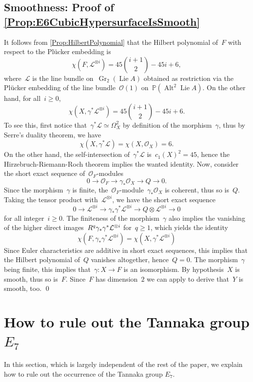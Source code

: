 \documentclass[a4paper]{amsart}
\newcommand{\bbP}{\mathbb{P}}
\newcommand{\cL}{\mathcal{L}}
\newcommand{\cO}{\mathcal{O}}
\newcommand{\rR}{\textup{R}}
\newcommand{\too}{\longrightarrow}
\newcommand{\iso}{\simeq}
\DeclareMathOperator{\Gr}{Gr}
\DeclareMathOperator{\Lie}{Lie}
\DeclareMathOperator{\Alt}{Alt}
\renewcommand{\ge}{\geqslant}
\theoremstyle{plain}
\theoremstyle{definition}
\numberwithin{equation}{section}
\begin{document}
\subsection{Smoothness: Proof of \cref{Prop:E6CubicHypersurfaceIsSmooth}}  It follows from \cref{Prop:HilbertPolynomial} that the Hilbert polynomial of~$F$ with respect to the Pl\"ucker embedding is
\[ \chi(F, \cL^{\otimes i}) =  \textstyle 45 \binom{i+1}{2} - 45 i + 6,\]
where~$\cL$ is the line bundle on~$\Gr_2(\Lie A)$ obtained as restriction via the Pl\"ucker embedding of the line bundle~$\cO(1)$ on~$\bbP(\Alt^2 \Lie A)$. On the other hand, for all~$i \ge 0$,
\[ \chi(X, \gamma^\ast \cL^{\otimes i}) =  \textstyle 45 \binom{i+1}{2} - 45 i + 6.\]
To see this, first notice that~$\gamma^\ast \cL \iso \Omega^2_X$ by definition of the morphism~$\gamma$, thus by Serre's duality theorem, we have
\[\chi(X, \gamma^\ast \cL)  =  \chi(X, \cO_X) = 6.\]
On the other hand, the self-intersection of~$\gamma^\ast \cL$ is~$c_1(X)^2 = 45$, hence the Hirzebruch-Riemann-Roch theorem implies the wanted identity. Now, consider the short exact sequence of~$\cO_F$-modules
\[ 0 \too \cO_F \too \gamma_\ast \cO_X \too Q \too 0.\]
Since the morphism~$\gamma$ is finite, the~$\cO_F$-module~$\gamma_\ast \cO_X$ is coherent, thus so is~$Q$. Taking the tensor product with~$\cL^{\otimes i}$, we have the short exact sequence
\[ 0 \too \cL^{\otimes i} \too \gamma_\ast \gamma^\ast  \cL^{\otimes i} \too Q \otimes \cL^{\otimes i} \too 0\]
for all integer~$i \ge 0$. The finiteness of the morphism~$\gamma$ also implies the vanishing of the higher direct images~$\rR^q \gamma_\ast \gamma^\ast \cL^{\otimes i}$ for~$q \ge 1$, which yields the identity
\[ \chi(F, \gamma_\ast \gamma^\ast  \cL^{\otimes i}) = \chi(X, \gamma^\ast  \cL^{\otimes i})\]
Since Euler characteristics are additive in short exact sequences, this implies that the Hilbert polynomial of~$Q$ vanishes altogether, hence~$Q = 0$. The morphism~$\gamma$ being finite, this implies that~$\gamma \colon X\to F$ is an isomorphism. By hypothesis~$X$ is smooth, thus so is~$F$. Since~$F$ has dimension~$2$ we can apply \cite[th.~4.2]{AltmanKleiman} to derive that~$Y$ is smooth, too.
\qed

\section{How to rule out the Tannaka group \texorpdfstring{$E_7$}{E7}}
\label{sec:E7}

In this section, which is largely independent of the rest of the paper, we explain how to rule out the occurrence of the Tannaka group $E_7$.
\end{document}
